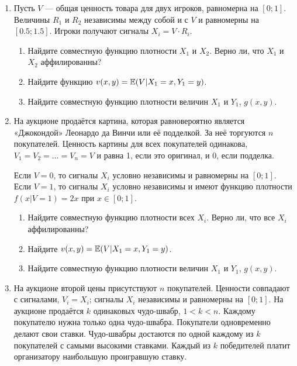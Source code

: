 \begin{enumerate}


\item Пусть $  V $ — общая ценность товара для двух игроков, равномерна на $ [0;1] $. Величины $ R_{1} $ и $ R_{2} $ независимы между собой и с $ V $ и равномерны на $ [0.5;1.5] $. Игроки получают сигналы $ X_{i}=V\cdot R_{i} $.
\begin{enumerate}
\item Найдите совместную функцию плотности $ X_{1} $ и $ X_{2} $. Верно ли, что $ X_{1} $ и $ X_{2} $ аффилированны? 
\item Найдите функцию $ v(x,y)=\operatorname{\mathbb{E}}(V|X_{1}=x,Y_{1}=y) $.
\item Найдите совместную функцию плотности величин $ X_{1} $ и $ Y_{1} $, $ g(x,y) $.
\end{enumerate}


\item На аукционе продаётся картина, которая равновероятно является «Джокондой» Леонардо да Винчи или её подделкой. За неё торгуются $ n $ покупателей. Ценность картины для всех покупателей одинакова, $ V_{1}=V_{2}=\ldots=V_{n}=V $ и равна 1, если это оригинал, и 0, если подделка.

Если $ V=0 $, то сигналы $ X_{i} $ условно независимы и равномерны на $ [0;1] $. Если $ V=1 $, то сигналы $ X_{i} $ условно независимы и имеют функцию плотности $ f(x|V=1)=2x $ при  $x\in [0;1] $.
\begin{enumerate}
\item Найдите совместную функцию плотности всех $ X_{i} $. Верно ли, что все $ X_{i} $ аффилированны?
\item Найдите $ v(x,y)=\operatorname{\mathbb{E}}(V|X_{1}=x,Y_{1}=y) $.
\item Найдите совместную функцию плотности величин $ X_{1} $ и $ Y_{1} $, $ g(x,y) $.
\end{enumerate}



\item На аукционе второй цены присутствуют $ n $ покупателей. Ценности совпадают с сигналами, $ V_{i}=X_{i} $; сигналы $ X_{i} $ независимы и равномерны на $ [0;1] $. На аукционе продаётся $k$ одинаковых чудо-швабр, $ 1<k<n $. Каждому покупателю нужна только одна чудо-швабра. Покупатели одновременно делают свои ставки. Чудо-швабры достаются по одной каждому из $ k $ покупателей с самыми высокими ставками. Каждый из $ k $ победителей платит организатору наибольшую проигравшую ставку.


\end{enumerate}
